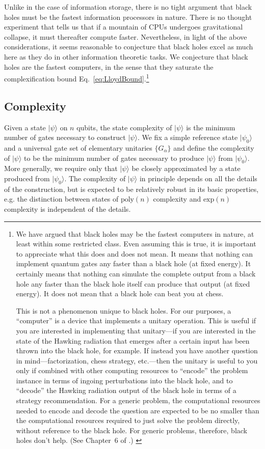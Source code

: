 \documentclass[12pt]{article}
\numberwithin{equation}{section}
\newcommand{\ket}[1]{| #1 \rangle }
\begin{document}
Unlike in the case of information storage, there is no tight argument that black holes must be the fastest information processors in nature. There is no thought experiment that tells us that if a mountain of CPUs undergoes gravitational collapse, it must thereafter compute faster. Nevertheless, in light of the above considerations, it seems reasonable to conjecture that black holes excel as much here as they do in other information theoretic tasks. We conjecture that black holes are the fastest computers, in the sense that they saturate the complexification bound Eq.~\ref{eq:LloydBound}.\footnote{We have argued that black holes may be the fastest computers in nature, at least within some restricted class. Even assuming this is true, it is important to appreciate what this does and does not mean. It means that nothing can implement quantum gates any faster than a black hole (at fixed energy). It certainly means that nothing can simulate the complete output from a black hole any faster than the black hole itself can produce that output (at fixed energy). It does not mean that a black hole can beat you at chess.

This is not a phenomenon unique to black holes. For our purposes, a ``computer'' is a device that implements a unitary operation. This is useful if you are interested in implementing that unitary---if you are interested in the state of the Hawking radiation that emerges after a certain input has been thrown into the black hole, for example. If instead you have another question in mind---factorization, chess strategy, etc.---then the unitary is useful to you only if combined with other computing resources to ``encode'' the problem instance in terms of ingoing perturbations into the black hole, and to ``decode'' the Hawking radiation output of the black hole in terms of a strategy recommendation. For a generic problem, the computational resources needed to encode and decode the question are expected to be no smaller than the computational resources required to just solve the problem directly, without reference to the black hole. For generic problems, therefore, black holes don't help. (See Chapter~6 of \cite{DBLP:journals/corr/abs-1108-1791}.) \label{eq:footnotecomputionalism}}


\subsection{Complexity}

Given a state $\ket{\psi}$ on $n$ qubits, the state complexity of $\ket{\psi}$ is the minimum number of gates necessary to construct $\ket{\psi}$. We fix a simple reference state $\ket{\psi_0}$ and a universal gate set of elementary unitaries $\{G_\alpha\}$ and define the complexity of $\ket{\psi}$ to be the minimum number of gates necessary to produce $\ket{\psi}$ from $\ket{\psi_0}$. More generally, we require only that $\ket{\psi}$ be closely approximated by a state produced from $\ket{\psi_0}$. The complexity of $\ket{\psi}$ in principle depends on all the details of the construction, but is expected to be relatively robust in its basic properties, e.g. the distinction between states of $\text{poly}(n)$ complexity and $\text{exp}(n)$ complexity is independent of the details.
\end{document}
